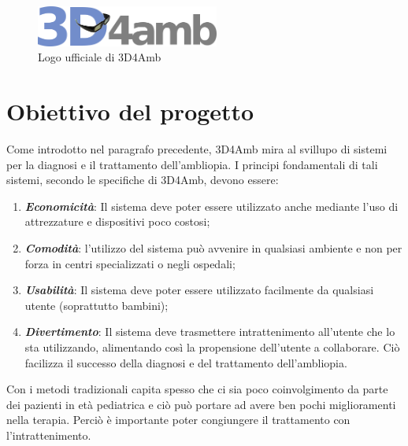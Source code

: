 \documentclass[12pt,a4paper,openright,twoside]{book}
\begin{document}
     \begin{figure}[h]
    	\centering   	
    	\includegraphics[width=60mm]{logo3d4amb.png}
    	\caption{Logo ufficiale di 3D4Amb}
    	\label{fig:3d4amb}
    \end{figure}
    \section{Obiettivo del progetto}
    Come introdotto nel paragrafo precedente, 3D4Amb mira al svillupo di sistemi per la diagnosi e il trattamento dell'ambliopia. I principi fondamentali di tali sistemi, secondo le specifiche di 3D4Amb, devono essere:
    \begin{enumerate}
    	\item \textbf{\textit{Economicità}}: Il sistema deve poter essere utilizzato anche mediante l'uso di attrezzature e dispositivi poco costosi;
    	\item \textbf{\textit{Comodità}}: l'utilizzo del sistema può avvenire in qualsiasi ambiente e non per forza in centri specializzati o negli ospedali;
    	\item \textbf{\textit{Usabilità}}: Il sistema deve poter essere utilizzato facilmente da qualsiasi utente (soprattutto bambini);
    	\item \textbf{\textit{Divertimento}}: Il sistema deve trasmettere intrattenimento all'utente che lo sta utilizzando, alimentando così la propensione dell'utente a collaborare. Ciò facilizza il successo della diagnosi e del trattamento dell'ambliopia. 
    \end{enumerate}
	Con i metodi tradizionali capita spesso che ci sia poco coinvolgimento da parte dei pazienti in età pediatrica e ciò può portare ad avere ben pochi miglioramenti nella terapia. Perciò è importante poter congiungere il trattamento con l'intrattenimento.
	
\end{document}

